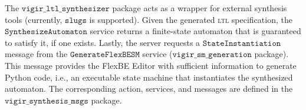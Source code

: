 The $\mathtt{vigir\_ltl\_synthesizer}$ package acts as a wrapper for external synthesis tools (currently, $\mathtt{slugs}$\cite{SLUGS} is supported).
Given the generated \textsc{ltl} specification, the $\mathtt{Synthesize Automaton}$ service returns a finite-state automaton that is guaranteed to satisfy it, if one exists.
Lastly, the server requests a $\mathtt{State Instantiation}$ message from the $\mathtt{Generate FlexBE SM}$ service ($\mathtt{vigir\_sm\_generation}$ package).
This message provides the FlexBE Editor with sufficient information to generate Python code, i.e., an executable state machine that instantiates the synthesized automaton.
The corresponding action, services, and messages are defined in the $\mathtt{vigir\_synthesis\_msgs}$ package.

%
%

